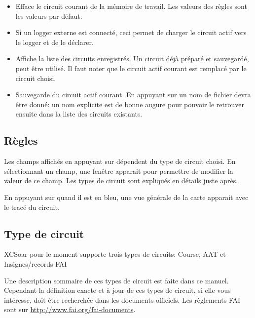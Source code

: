 \begin{itemize}
\item {} Efface le circuit courant de la mémoire de travail. Les valeurs des règles sont les valeurs par défaut.
\item {}  Si un logger externe est connecté, ceci permet de charger le circuit actif vers le logger et de le déclarer.
\item {} Affiche la liste des circuits enregistrés. Un circuit déjà préparé et sauvegardé, peut être utilisé. Il faut noter que le circuit actif courant est remplacé par le circuit choisi.
\item {}  Sauvegarde du circuit actif courant. En appuyant sur  un nom de fichier devra être donné: un nom explicite est de bonne augure pour pouvoir le retrouver ensuite dans la liste des circuits existants.
\end{itemize}

\subsection*{Règles}
Les champs affichés en appuyant sur   dépendent du type de circuit choisi. En sélectionnant un champ, une fenêtre apparait pour permettre de modifier la valeur de ce champ. Les types de circuit sont expliqués en détails juste après.

En appuyant sur  quand il est en bleu, une vue générale de la carte apparait avec le tracé du circuit.

\subsection*{Type de circuit}
XCSoar pour le moment supporte trois types de circuits: Course, AAT et Insignes/records FAI

Une description sommaire de ces types de circuit est faite dans ce manuel. Cependant la définition exacte et à jour de ces types de circuit, si elle vous intéresse, doit être recherchée  dans les documents officiels. Les règlements FAI sont sur  \url{http://www.fai.org/fai-documents}.


